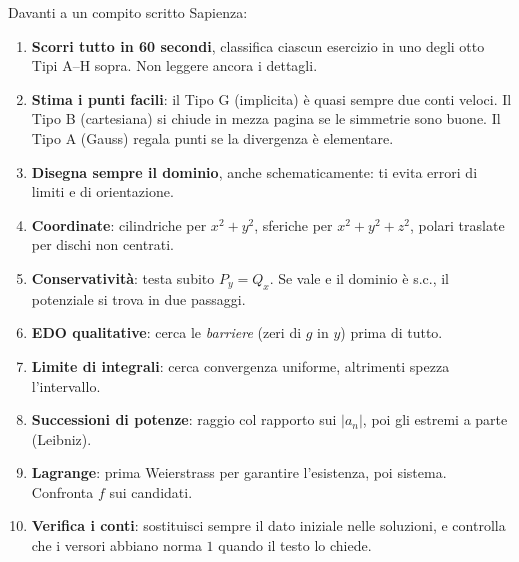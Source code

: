 \documentclass[11pt,a4paper,openany]{book}
\theoremstyle{plain}
\theoremstyle{definition}
\theoremstyle{remark}
\begin{document}
\begin{nota}[title={Il decalogo del ragionamento}]
Davanti a un compito scritto Sapienza:
\begin{enumerate}
\item \textbf{Scorri tutto in 60 secondi}, classifica ciascun esercizio
   in uno degli otto Tipi A--H sopra. Non leggere ancora i dettagli.
\item \textbf{Stima i punti facili}: il Tipo G (implicita) \`e quasi
   sempre due conti veloci. Il Tipo B (cartesiana) si chiude in mezza
   pagina se le simmetrie sono buone. Il Tipo A (Gauss) regala punti
   se la divergenza \`e elementare.
\item \textbf{Disegna sempre il dominio}, anche schematicamente: ti
   evita errori di limiti e di orientazione.
\item \textbf{Coordinate}: cilindriche per $x^2+y^2$, sferiche per
   $x^2+y^2+z^2$, polari traslate per dischi non centrati.
\item \textbf{Conservativit\`a}: testa subito $P_y=Q_x$. Se vale e il
   dominio \`e s.c., il potenziale si trova in due passaggi.
\item \textbf{EDO qualitative}: cerca le \emph{barriere} (zeri di $g$
   in $y$) prima di tutto.
\item \textbf{Limite di integrali}: cerca convergenza uniforme,
   altrimenti spezza l'intervallo.
\item \textbf{Successioni di potenze}: raggio col rapporto sui $|a_n|$,
   poi gli estremi a parte (Leibniz\!).
\item \textbf{Lagrange}: prima Weierstrass per garantire l'esistenza,
   poi sistema. Confronta $f$ sui candidati.
\item \textbf{Verifica i conti}: sostituisci sempre il dato iniziale
   nelle soluzioni, e controlla che i versori abbiano norma $1$ quando
   il testo lo chiede.
\end{enumerate}
\end{nota}
\end{document}
